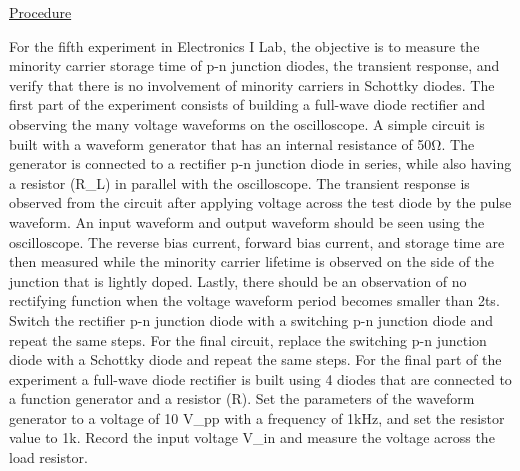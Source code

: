 \underline{Procedure}

For the fifth experiment in Electronics I Lab, the objective is to measure the minority carrier storage time of p-n junction diodes, the transient response, and verify that there is no involvement of minority carriers in Schottky diodes. The first part of the experiment consists of building a full-wave diode rectifier and observing the many voltage waveforms on the oscilloscope. A simple circuit is built with a waveform generator that has an internal resistance of 50Ω. The generator is connected to a rectifier p-n junction diode in series, while also having a resistor (R_L) in parallel with the oscilloscope. The transient response is observed from the circuit after applying voltage across the test diode by the pulse waveform. An input waveform and output waveform should be seen using the oscilloscope. The reverse bias current, forward bias current, and storage time are then measured while the minority carrier lifetime is observed on the side of the junction that is lightly doped. Lastly, there should be an observation of no rectifying function when the voltage waveform period becomes smaller than 2ts. Switch the rectifier p-n junction diode with a switching p-n junction diode and repeat the same steps. For the final circuit, replace the switching p-n junction diode with a Schottky diode and repeat the same steps. For the final part of the experiment a full-wave diode rectifier is built using 4 diodes that are connected to a function generator and a resistor (R). Set the parameters of the waveform generator to a voltage of 10 {V_{pp}} with a frequency of 1kHz, and set the resistor value to 1k\ohm. Record the input voltage {V_{in}} and measure the voltage across the load resistor. \\

